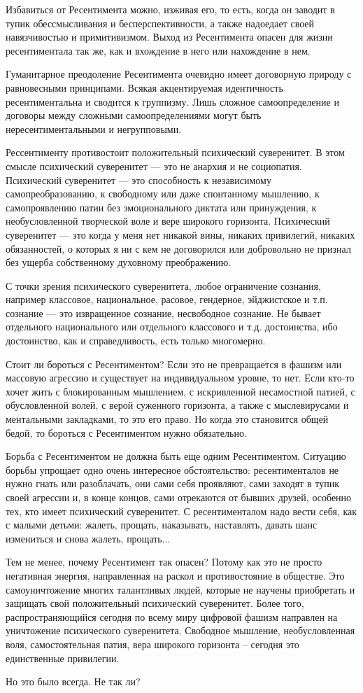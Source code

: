 Избавиться от Ресентимента можно, изживая его, то есть, когда он заводит в
тупик обессмысливания и бесперспективности, а также надоедает своей
навязчивостью и примитивизмом. Выход из Ресентимента опасен для жизни
ресентиментала так же, как и вхождение в него или нахождение в нем.

Гуманитарное преодоление Ресентимента очевидно имеет договорную природу с
равновесными принципами. Всякая акцентируемая идентичность ресентиментальна и
сводится к группизму. Лишь сложное самоопределение и договоры между сложными
самоопределениями могут быть нересентиментальными и негрупповыми.

Рессентименту противостоит положительный психический суверенитет. В этом смысле
психический суверенитет — это не анархия и не социопатия. Психический
суверенитет — это способность к независимому самопреобразованию, к свободному
или даже спонтанному мышлению, к самопроявлению патии без эмоционального
диктата или принуждения, к необусловленной творческой воле и вере широкого
горизонта. Психический суверенитет — это когда у меня нет никакой вины, никаких
привилегий, никаких обязанностей, о которых я ни с кем не договорился или
добровольно не признал без ущерба собственному духовному преображению.

С точки зрения психического суверенитета, любое ограничение сознания, например
классовое, национальное, расовое, гендерное, эйджистское и т.п. сознание — это
извращенное сознание, несвободное сознание. Не бывает отдельного национального
или отдельного классового и т.д. достоинства, ибо достоинство, как и
справедливость, есть только многомерно.

Стоит ли бороться с Ресентиментом? Если это не превращается в фашизм или
массовую агрессию и существует на индивидуальном уровне, то нет. Если кто-то
хочет жить с блокированным мышлением, с искривленной несамостной патией, с
обусловленной волей, с верой суженного горизонта, а также с мыслевирусами и
ментальными закладками, то это его право. Но когда это становится общей бедой,
то бороться с Ресентиментом нужно обязательно.

Борьба с Ресентиментом не должна быть еще одним Ресентиментом. Ситуацию борьбы
упрощает одно очень интересное обстоятельство: ресентименталов не нужно гнать
или разоблачать, они сами себя проявляют, сами заходят в тупик своей агрессии
и, в конце концов, сами отрекаются от бывших друзей, особенно тех, кто имеет
психический суверенитет. С ресентименталом надо вести себя, как с малыми
детьми: жалеть, прощать, наказывать, наставлять, давать шанс измениться и снова
жалеть, прощать...

Тем не менее, почему Ресентимент так опасен? Потому как это не просто
негативная энергия, направленная на раскол и противостояние в обществе. Это
самоуничтожение многих талантливых людей, которые не научены приобретать и
защищать свой положительный психический суверенитет. Более того,
распространяющийся сегодня по всему миру цифровой фашизм направлен на
уничтожение психического суверенитета. Свободное мышление, необусловленная
воля, самостоятельная патия, вера широкого горизонта – сегодня это единственные
привилегии.

Но это было всегда. Не так ли?
